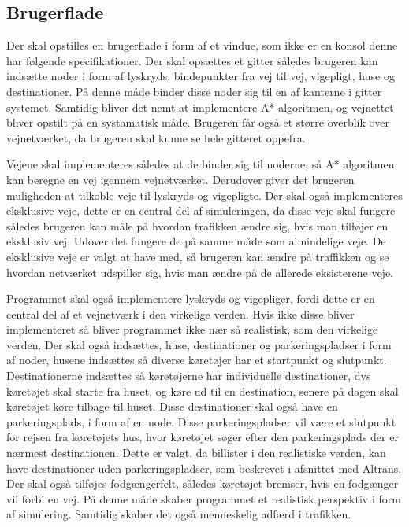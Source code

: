 \vspace{5mm}

\subsection{Brugerflade}
Der skal opstilles en brugerflade i form af et vindue, som ikke er en konsol denne har følgende specifikationer. Der skal opsættes et gitter således brugeren kan indsætte noder i form af lyskryds, bindepunkter fra vej til vej, vigepligt, huse og destinationer. På denne måde binder disse noder sig til en af kanterne i gitter systemet. Samtidig bliver det nemt at implementere A* algoritmen, og vejnettet bliver opstilt på en systamatisk måde. Brugeren får også et større overblik over vejnetværket, da brugeren skal kunne se hele gitteret oppefra.

\vspace{5mm}

Vejene skal implementeres således at de binder sig til noderne, så A* algoritmen kan beregne en vej igennem vejnetværket. Derudover giver det brugeren muligheden at tilkoble veje til lyskryds og vigepligte. Der skal også implementeres eksklusive veje, dette er en central del af simuleringen, da disse veje skal fungere således brugeren kan måle på hvordan trafikken ændre sig, hvis man tilføjer en eksklusiv vej. Udover det fungere de på samme måde som almindelige veje. De eksklusive veje er valgt at have med, så brugeren kan ændre på traffikken og se hvordan netværket udspiller sig, hvis man ændre på de allerede eksisterene veje.

\vspace{5mm}

Programmet skal også implementere lyskryds og vigepliger, fordi dette er en central del af et vejnetværk i den virkelige verden. Hvis ikke disse bliver implementeret så bliver programmet ikke nær så realistisk, som den virkelige verden. Der skal også indsættes, huse, destinationer og parkeringspladser i form af noder, husene indsættes så diverse køretøjer har et startpunkt og slutpunkt. Destinationerne indsættes så køretøjerne har individuelle destinationer, dvs køretøjet skal starte fra huset, og køre ud til en destination, senere på dagen skal køretøjet køre tilbage til huset. Disse destinationer skal også have en parkeringsplads, i form af en node. Disse parkeringspladser vil være et slutpunkt for rejsen fra køretøjets hus, hvor køretøjet søger efter den parkeringsplads der er nærmest destinationen. Dette er valgt, da billister i den realistiske verden, kan have destinationer uden parkeringspladser, som beskrevet i afsnittet med Altrans. Der skal også tilføjes fodgængerfelt, således køretøjet bremser, hvis en fodgænger vil forbi en vej. På denne måde skaber programmet et realistisk perspektiv i form af simulering. Samtidig skaber det også menneskelig adfærd i trafikken.

